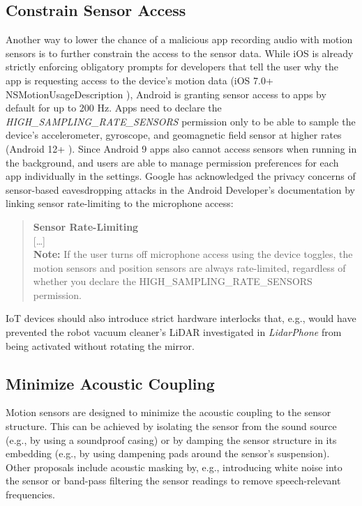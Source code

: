\documentclass[sigconf, nonacm]{acmart}
\begin{document}
\subsection{Constrain Sensor Access}
Another way to lower the chance of a malicious app recording audio with motion sensors is to further constrain the access to the sensor data.
While iOS is already strictly enforcing obligatory prompts for developers that tell the user why the app is requesting access to the device's motion data (iOS 7.0+ NSMotionUsageDescription \cite{AppleDeveloperMotionUsageDescription}), Android is granting sensor access to apps by default for up to 200 Hz. Apps need to declare the \textit{HIGH\_SAMPLING\_RATE\_SENSORS} permission only to be able to sample the device's accelerometer, gyroscope, and geomagnetic field sensor at higher rates (Android 12+ \cite{AndroidDeveloperSensorDocs}).
Since Android 9 apps also cannot access sensors when running in the background, and users are able to manage permission preferences for each app individually in the settings.
Google has acknowledged the privacy concerns of sensor-based eavesdropping attacks in the Android Developer's documentation \cite{AndroidDeveloperSensorDocs} by linking sensor rate-limiting to the microphone access:
\begin{quote}
\vspace{0.1cm}
\textbf{Sensor Rate-Limiting} \\
{[\ldots]} \\
\textbf{Note:} If the user turns off microphone access using the device toggles, the motion sensors and position sensors are always rate-limited, regardless of whether you declare the HIGH\_SAMPLING\_RATE\_SENSORS permission.
\end{quote}

\noindent
IoT devices should also introduce strict hardware interlocks that, e.g., would have prevented the robot vacuum cleaner's LiDAR investigated in \textit{LidarPhone} \cite{LidarPhone2020} from being activated without rotating the mirror.

\subsection{Minimize Acoustic Coupling}
Motion sensors are designed to minimize the acoustic coupling to the sensor structure.
This can be achieved by isolating the sensor from the sound source (e.g., by using a soundproof casing) or by damping the sensor structure in its embedding (e.g., by using dampening pads around the sensor's suspension).
Other proposals include acoustic masking by, e.g., introducing white noise into the sensor or band-pass filtering the sensor readings to remove speech-relevant frequencies.
\end{document}

